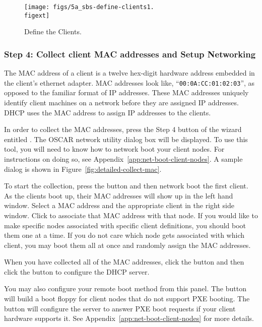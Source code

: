 \begin{figure}[htbp]
  \begin{center}
    \texttt{[image: figs/5a\_sbs-define-clients1.\\figext]}
    \caption{Define the Clients.}
    \label{fig:detailed-define-clients}
  \end{center}
\end{figure}
    

\subsubsection{Step 4: Collect client MAC addresses and Setup Networking} 
\label{det:setupnetwork}

The MAC address of a client is a twelve hex-digit hardware address
embedded in the client's ethernet adapter. MAC addresses look like,
``{\tt 00:0A:CC:01:02:03}'', as opposed to the familiar format of IP
addresses. These MAC addresses uniquely identify client machines on a
network before they are assigned IP addresses. DHCP uses the MAC
address to assign IP addresses to the clients.

In order to collect the MAC addresses, press the Step 4 button of the
wizard entitled . The OSCAR network utility
dialog box will be displayed.  To use this tool, you will need to know
how to network boot your client nodes.  For instructions on doing so,
see Appendix~\ref{app:net-boot-client-nodes}. A sample dialog is shown
in Figure~\ref{fig:detailed-collect-mac}.

To start the collection, press the  button
and then network boot the first client.  As the clients boot up, their
MAC addresses will show up in the left hand window. Select a MAC
address and the appropriate client in the right side window. Click
 to associate that MAC address with that
node. If you would like to make specific nodes associated with
specific client definitions, you should boot them one at a time. If
you do not care which node gets associated with which client, you may
boot them all at once and randomly assign the MAC addresses.

When you have collected all of the MAC addresses, click the
 button and then click the  button to configure the DHCP server.
 
You may also configure your remote boot method from this panel. The
 button will build a boot floppy for
client nodes that do not support PXE booting. The  button will configure the server to answer PXE boot
requests if your client hardware supports it. See
Appendix~\ref{app:net-boot-client-nodes} for more details.  

